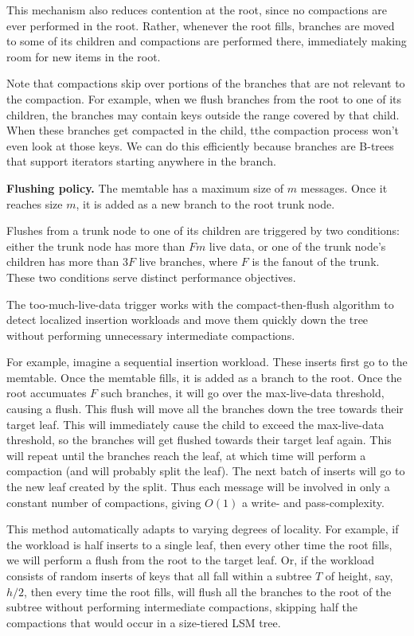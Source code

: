 This mechanism also reduces contention at the root, since no
compactions are ever performed in the root.  Rather, whenever the root
fills, branches are moved to some of its children and compactions are
performed there, immediately making room for new items in the root.

Note that compactions skip over portions of the branches that are not
relevant to the compaction.  For example, when we flush branches from
the root to one of its children, the branches may contain keys outside
the range covered by that child.  When these branches get
compacted in the child, tthe compaction process won't
even look at those keys.  We can do this efficiently because branches
are B-trees that support iterators starting anywhere in the branch.

\textbf{Flushing policy.} 
The memtable has a maximum size of $m$ messages. 
Once it reaches size $m$, it is added as a
new branch to the root trunk node.

Flushes from a trunk node to one of its children are triggered by two
conditions: either the trunk node has more than $Fm$ live data, or one
of the trunk node's children has more than $3F$ live branches, where
$F$ is the fanout of the trunk.  These two conditions serve distinct
performance objectives.

The too-much-live-data trigger works with the compact-then-flush
algorithm to detect localized insertion workloads and move them
quickly down the tree without performing unnecessary intermediate
compactions.

For example, imagine a sequential insertion workload.  These inserts
first go to the memtable.  Once the memtable fills, it is added as a
branch to the root.  Once the root accumuates $F$ such branches, it
will go over the max-live-data threshold, causing a flush.  This flush
will move all the branches down the tree towards their target leaf.
This will immediately cause the child to exceed the max-live-data
threshold, so the branches will get flushed towards their target leaf
again.  This will repeat until the branches reach the leaf, at which
time \sysname will perform a compaction (and will probably split the
leaf).  The next batch of inserts will go to the new leaf created by
the split.  Thus each message will be involved in only a constant
number of compactions, giving $O(1)$ a write- and pass-complexity.

This method automatically adapts to varying degrees of
locality.  For example, if the workload is half inserts to a single
leaf, then every other time the root fills, we will perform a flush
from the root to the target leaf.  Or, if the workload consists of
random inserts of keys that all fall within a subtree $T$ of height,
say, $h/2$, then every time the root fills, \sysname will flush all
the branches to the root of the subtree without performing
intermediate compactions, skipping half the compactions that would
occur in a size-tiered LSM tree.

